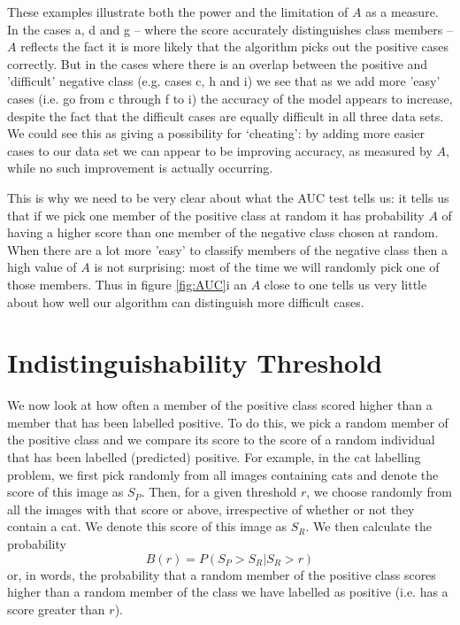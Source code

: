 \documentclass{article}
\begin{document}
These examples illustrate both the power and the limitation of $A$ as a measure. In the cases a, d and g – where the score accurately distinguishes class members – $A$ reflects the fact it is more likely that the algorithm picks out the positive cases correctly. But in the cases where there is an overlap between the positive and 'difficult' negative class (e.g. cases c, h and i) we see that as we add more 'easy' cases (i.e. go from c through f to i) the accuracy of the model appears to increase, despite the fact that the difficult cases are equally difficult in all three data sets. We could see this as giving a possibility for `cheating': by adding more easier cases to our data set we can appear to be improving accuracy, as measured by $A$, while no such improvement is actually occurring. 

This is why we need to be very clear about what the AUC test tells us: it tells us that if we pick one member of the positive class at random it has probability $A$ of having a higher score than one member of the negative class chosen at random. When there are a lot more 'easy'  to classify members of the negative class then a high value of $A$ is not surprising: most of the time we will randomly pick one of those members. Thus in figure \ref{fig:AUC}i  an $A$ close to one tells us very little about how well our algorithm can distinguish more difficult cases. 

\section{Indistinguishability Threshold}

We now look at how often a member of the positive class scored higher than a member that has been labelled positive. To do this, we pick a random member of the positive class and we compare its score to the score of a random individual that has been labelled (predicted) positive. For example, in the cat labelling problem, we first pick randomly from all images containing cats and denote the score of this image as $S_P$. Then, for a given threshold $r$, we choose randomly from all the images with that score or above, irrespective of whether or not they contain a cat. We denote this score of this image as $S_R$. We then calculate the probability 
\[
B(r) = P(S_P>S_R | S_R>r) 
\]
or, in words, the probability that a random member of the positive class scores higher than a random member of the class we have labelled as positive (i.e. has a score greater than $r$). 
\end{document}
